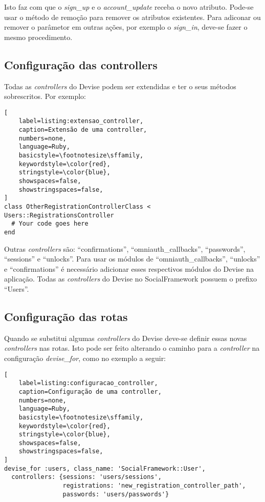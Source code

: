 Isto faz com que o \textit{sign\_up} e o \textit{account\_update} receba o novo atributo. Pode-se usar o método de remoção para remover os atributos existentes. Para adiconar ou remover o parâmetor em outras ações, por exemplo o \textit{sign\_in}, deve-se fazer o mesmo procedimento.

\subsection{Configuração das controllers}

Todas as \textit{controllers} do Devise podem ser extendidas e ter o seus métodos sobrescritos. Por exemplo:

\begin{lstlisting}[
    label=listing:extensao_controller,
    caption=Extensão de uma controller,
    numbers=none,
    language=Ruby,
    basicstyle=\footnotesize\sffamily,
    keywordstyle=\color{red},
    stringstyle=\color{blue},
    showspaces=false,
    showstringspaces=false,
]
class OtherRegistrationControllerClass < Users::RegistrationsController
  # Your code goes here
end
\end{lstlisting}

Outras \textit{controllers} são: ``confirmations'', ``omniauth\_callbacks'', ``passwords'', ``sessions'' e ``unlocks''. Para usar os módulos de ``omniauth\_callbacks'', ``unlocks'' e ``confirmations'' é necessário adicionar esses respectivos módulos do Devise na aplicação. Todas as \textit{controllers} do Devise no SocialFramework possuem o prefixo ``Users''.

\subsection{Configuração das rotas}

Quando se substitui algumas \textit{controllers} do Devise deve-se definir essas novas \textit{controllers} nas rotas. Isto pode ser feito alterando o caminho para a \textit{controller} na configuração \textit{devise\_for}, como no exemplo a seguir:

\begin{lstlisting}[
    label=listing:configuracao_controller,
    caption=Configuração de uma controller,
    numbers=none,
    language=Ruby,
    basicstyle=\footnotesize\sffamily,
    keywordstyle=\color{red},
    stringstyle=\color{blue},
    showspaces=false,
    showstringspaces=false,
]
devise_for :users, class_name: 'SocialFramework::User',
  controllers: {sessions: 'users/sessions',
                registrations: 'new_registration_controller_path',
                passwords: 'users/passwords'}
\end{lstlisting}

